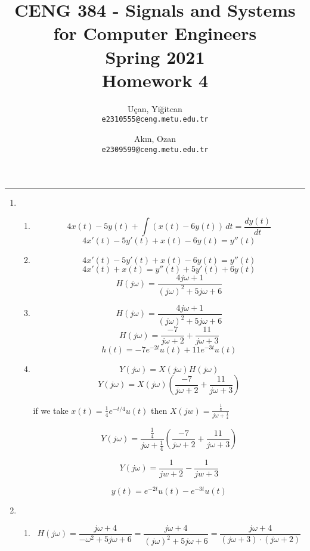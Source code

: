 \documentclass[10pt,a4paper, margin=1in]{article}
\author{
  Uçan, Yiğitcan\\
  \texttt{e2310555@ceng.metu.edu.tr}
  \and
  Akın, Ozan\\
  \texttt{e2309599@ceng.metu.edu.tr}
}
\title{CENG 384 - Signals and Systems for Computer Engineers \\
Spring 2021 \\
Homework 4}
\begin{document}
\maketitle



\noindent\rule{19cm}{1.2pt}

\begin{enumerate}

\item %
    \begin{enumerate}
    \item %
    \[ 4x(t) - 5y(t) + \int (x(t) - 6y(t)) \,dt = \frac{dy(t)}{dt} \]
    \[ 4x'(t) - 5y'(t) + x(t) - 6y(t) = y''(t) \]

    \item 
    
    \[ 4x'(t) - 5y'(t) + x(t) - 6y(t) = y''(t) \]
    \[ 4x'(t) + x(t) = y''(t) + 5y'(t) + 6y(t) \]
    \[ H(j\omega) = \frac{4j\omega + 1}{(j\omega)^2 + 5j\omega + 6} \]
    
    \item %
    
    \[ H(j\omega) = \frac{4j\omega + 1}{(j\omega)^2 + 5j\omega + 6} \]
    \[ H(j\omega) = \frac{-7}{j\omega + 2} + \frac{11}{j\omega + 3} \]
    \[ h(t) = -7 e^{-2t}u(t) + 11 e^{-3t}u(t) \]
    
    \item %
    
    \[ Y(j\omega) = X(j\omega) H(j\omega) \]
    \[ Y(j\omega) = X(j\omega) (\frac{-7}{j\omega + 2} + \frac{11}{j\omega + 3}) \]
    
    \begin{center}
        if we take $x(t) = \frac{1}{4}e^{-t/4}u(t)$ then $X(jw) = \frac{\frac{1}{4}}{j\omega + \frac{1}{4}}$
    \end{center}
    
    \[ Y(j\omega) = \frac{\frac{1}{4}}{j\omega + \frac{1}{4}} (\frac{-7}{j\omega + 2} + \frac{11}{j\omega + 3}) \]
    
    \[Y(j\omega) = \frac{1}{jw + 2} - \frac{1}{jw + 3}\]
    
    \[y(t) = e^{-2t}u(t) - e^{-3t}u(t) \]

    \end{enumerate}

\item %
    \begin{enumerate}
    \item %
    \[H(j\omega) = \frac{j\omega + 4}{-\omega^2 + 5 j \omega + 6} = \frac{j\omega + 4}{(j\omega)^2 + 5 j \omega + 6}= \frac{j\omega + 4}{(j\omega + 3) \cdot (j\omega + 2)} \]
    

\end{enumerate}
\end{enumerate}
\end{document}
